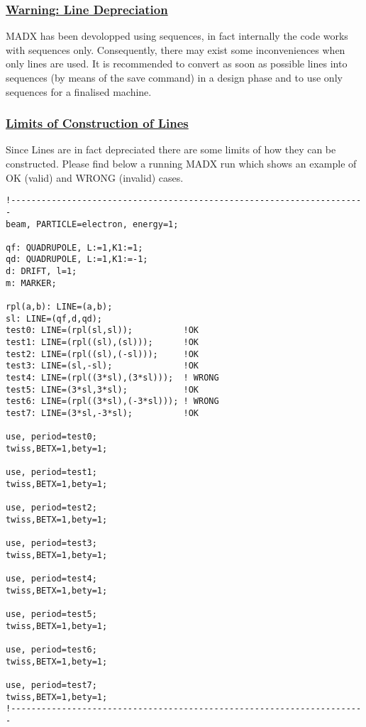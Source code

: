 \subsubsection{\href{Line_Depreciation}{Warning: Line Depreciation}} 
MADX has been devolopped using sequences, in fact internally the code
works with sequences only. Consequently, there may exist some
inconveniences when only lines are used. It is recommended to convert as
soon as possible lines into sequences (by means of the save command) in
a design phase and to use only sequences for a finalised machine.    

\subsubsection{\href{Line_Limits}{ Limits of Construction of Lines}}  
Since Lines are in fact depreciated there are some limits of how they
can be constructed. Please find below a running MADX run which shows an
example of OK (valid) and WRONG (invalid) cases.   

\begin{verbatim}
!----------------------------------------------------------------------
beam, PARTICLE=electron, energy=1;

qf: QUADRUPOLE, L:=1,K1:=1;
qd: QUADRUPOLE, L:=1,K1:=-1;
d: DRIFT, l=1;
m: MARKER;

rpl(a,b): LINE=(a,b);
sl: LINE=(qf,d,qd);
test0: LINE=(rpl(sl,sl));          !OK 
test1: LINE=(rpl((sl),(sl)));      !OK
test2: LINE=(rpl((sl),(-sl)));     !OK
test3: LINE=(sl,-sl);              !OK
test4: LINE=(rpl((3*sl),(3*sl)));  ! WRONG
test5: LINE=(3*sl,3*sl);           !OK
test6: LINE=(rpl((3*sl),(-3*sl))); ! WRONG
test7: LINE=(3*sl,-3*sl);          !OK

use, period=test0;
twiss,BETX=1,bety=1;

use, period=test1;
twiss,BETX=1,bety=1;

use, period=test2;
twiss,BETX=1,bety=1;

use, period=test3;
twiss,BETX=1,bety=1;

use, period=test4;
twiss,BETX=1,bety=1;

use, period=test5;
twiss,BETX=1,bety=1;

use, period=test6;
twiss,BETX=1,bety=1;

use, period=test7;
twiss,BETX=1,bety=1;
!----------------------------------------------------------------------
\end{verbatim}


